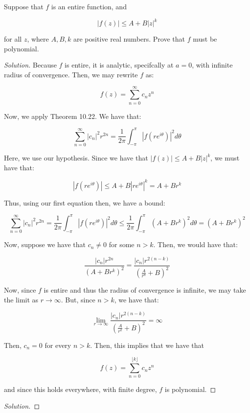 \documentclass[10pt]{article}
\newenvironment{problem}[2][]{\begin{trivlist}
\item[\hskip \labelsep {\bfseries #1}\hskip \labelsep {\bfseries #2.}]}{\end{trivlist}}
\begin{document}
\begin{problem}{Question 4}
Suppose that $f$ is an entire function, and

$$ | f(z) | \leq A + B|z|^k$$

for all $z$, where $A, B, k$ are positive real numbers. Prove that $f$ must be polynomial.

\end{problem}

\begin{proof}[Solution]

Because $f$ is entire, it is analytic, specifcally at $a = 0$, with infinite radius of convergence. Then, we may rewrite $f$ as:

$$f(z) = \sum_{n=0}^\infty c_n z^n $$

Now, we apply Theorem 10.22. We have that:

$$ \sum_{n=0}^\infty |c_n |^2 r^{2n} = \frac{1}{2\pi} \int_{-\pi}^\pi | f(re^{i\theta})|^2 d\theta $$

Here, we use our hypothesis. Since we have that $ | f(z) | \leq A + B|z|^k$, we must have that:

$$ |f(r e^{i\theta}) | \leq A + B |re^{i\theta}|^k = A + Br^k$$

Thus, using our first equation then, we have a bound:

$$  \sum_{n=0}^\infty |c_n |^2 r^{2n}  = \frac{1}{2\pi} \int_{-\pi}^\pi | f(re^{i\theta})|^2 d\theta \leq  \frac{1}{2\pi} \int_{-\pi}^\pi (A + Br^k)^2 d\theta = (A + Br^k)^2 $$

Now, suppose we have that $c_n \not = 0$ for some $n > k$. Then, we would have that:

$$\frac{|c_n| r^{2n}}{(A + Br^k)^2} = \frac{|c_n| r^{2(n - k)}}{(\frac{A}{r^k} + B)^2}$$

Now, since $f$ is entire and thus the radius of convergence is infinite,  we may take the limit as $r \to \infty$. But, since $n > k$, we have that:

$$ \lim_{r \to \infty} \frac{|c_n| r^{2(n - k)}}{(\frac{A}{r^k} + B)^2} = \infty$$

Then, $c_n = 0$ for every $n > k$. Then, this implies that we have that

$$ f(z) = \sum_{n=0}^{ \lfloor k \rfloor } c_n z^n $$

and since this holds everywhere, with finite degree, $f$ is polynomial.

\end{proof}

\begin{problem}{Question 5}

\end{problem}

\begin{proof}[Solution]

\end{proof}
\end{document}
